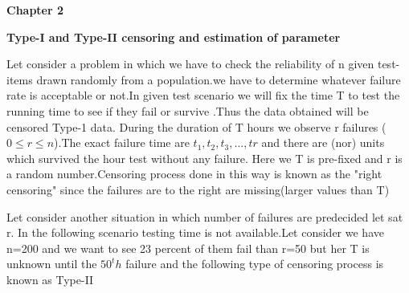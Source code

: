 \documentclass[12pt]{article}
\begin{document}
\begin{Parallel}[v]{0.48\textwidth}{0.48\textwidth}
	\ParallelLText{ 
		\[
		f(x)= 
		\begin{cases}
		\frac{x}{\sigma}      & \text{iff } -\infty<\mu<\infty,x>\mu\\
		0,         & \text{otherwise} 
		\end{cases}
		\] }
\end{Parallel}


\newpage
\begin{flushleft}
	\textbf{\Large Chapter 2}
\end{flushleft}
\vspace{0.1cm}
\begin{flushleft}
	\textbf{\Large Type-I and Type-II censoring and estimation of parameter}
\end{flushleft}
\vspace{0.2cm}
Let consider a problem in which we have to check the reliability of n given test-items drawn randomly from a population.we have to determine whatever failure
rate is acceptable or not.In given test scenario we will fix the time T to test the running time to see if they fail or survive .Thus the data obtained will be censored Type-1 data.
During the duration of T hours we observe r failures ($0\leq r \leq n$).The exact failure time are $t_{1},t_{2},t_{3},...,t{r}$ and there are (nor) units which survived the hour test without any failure. Here we T is pre-fixed and r is a random number.Censoring process done in this way is known as the "right censoring"
since the failures are to the right are missing(larger values than T)

Let consider another situation in which number of failures are predecided let sat r.
In the following scenario testing time is not available.Let consider we have n=200
and we want to see 23 percent of them fail than r=50 but her T is unknown until the $50^th$ failure and the following type of censoring process is known as Type-II 
\\
\end{document}
